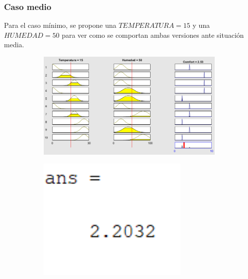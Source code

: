 \documentclass[11pt, letterpaper]{article}
\begin{document}
\newpage

\subsubsection{Caso medio}
Para el caso mínimo, se propone una $TEMPERATURA=15$ y una $HUMEDAD=50$ para ver como se comportan ambas versiones ante situación media.

\begin{figure}[h]
	\centering
	\begin{subfigure}{0.40\textwidth} %
		\centering
		\includegraphics[width=1.4\textwidth]{IMG/RP22.png}
		\label{fig:G14}
	\end{subfigure}
	\hfill
	\begin{subfigure}{0.42\textwidth} %
		\centering
		\includegraphics[width=0.8\textwidth]{IMG/M22.png}
		\label{fig:G15}
	\end{subfigure}
	\label{fig:comparacion7}
\end{figure}
\end{document}

